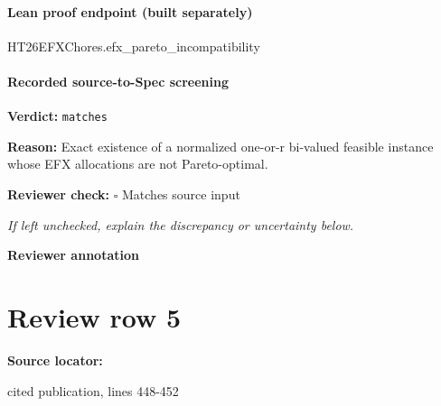 \documentclass[10pt]{article}
\newcommand{\reviewerbox}{%
  \par\noindent\fbox{\parbox{0.96\linewidth}{\rule{0pt}{0.38in}}}\par
}
\newcommand{\reviewmatch}[1]{%
  \par\noindent\textbf{Reviewer check:} $\square$\; #1\par
  \noindent\emph{If left unchecked, explain the discrepancy or uncertainty below.}\par
}
\begin{document}
\paragraph{Lean proof endpoint (built separately)}\begin{ReviewVerbatim}
HT26EFXChores.efx_pareto_incompatibility
\end{ReviewVerbatim}

\paragraph{Recorded source-to-Spec screening}
\textbf{Verdict:} \texttt{matches}
\\
{\raggedright
\textbf{Reason:} Exact existence of a normalized one-\allowbreak{}or-\allowbreak{}r bi-\allowbreak{}valued feasible instance whose EFX allocations are not Pareto-\allowbreak{}optimal.\allowbreak{}
\par}
\reviewmatch{Matches source input}
\noindent\textbf{Reviewer annotation}\par
\reviewerbox
\clearpage
\hypertarget{source-claim-6906c411c024867a}{}
\section*{Review row 5}
\textbf{Source locator:} {\footnotesize\raggedright cited publication, lines 448-\allowbreak{}452\par}
\end{document}

